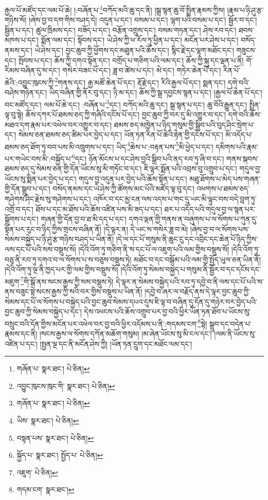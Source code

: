 རྒྱལ་པོ་མཛོད་དང་ལམ་པོ་ཆེ། །:བཞོན་པ་\footnote{གཞོན་པ་  སྣར་ཐང་།  པེ་ཅིན། }བཀོད་མའི་ཆུ་དང་ནི། །སྒྲ་སྙན་ཆུ་བོ་སྤྲིན་རྣམས་ཀྱིས། །རྣམ་པ་ཉི་ཤུ་རྩ་གཉིས་སོ། །ཞེས་བྱ་བ་དག་གིས་བཤད་དེ། འདུན་པ་དང་། བསམ་པ་དང་། ལྷག་པའི་བསམ་པ་དང་། སྦྱོར་བ་དང་། སྦྱིན་པ་དང་། ཚུལ་ཁྲིམས་དང་། བཟོད་པ་དང་། བརྩོན་འགྲུས་དང་། བསམ་གཏན་དང་། ཤེས་རབ་དང་། ཐབས་མཁས་པ་དང་། སྨོན་ལམ་དང་། སྟོབས་དང་། ཡེ་ཤེས་ཀྱི་ཕ་རོལ་ཏུ་ཕྱིན་པ་དང་། མངོན་པར་ཤེས་པ་དང་། བསོད་ནམས་དང་། ཡེ་ཤེས་དང་། བྱང་ཆུབ་ཀྱི་ཕྱོགས་དང་མཐུན་པའི་ཆོས་དང་། སྙིང་རྗེ་དང་ལྷག་མཐོང་དང་། གཟུངས་དང་། སྤོབས་པ་དང་། ཆོས་ཀྱི་དགའ་སྟོན་དང་། བགྲོད་པ་གཅིག་པའི་ལམ་དང་། ཆོས་ཀྱི་སྐུ་དང་ལྡན་པ་ནི། གོ་རིམས་བཞིན་དུ་ས་དང་། གསེར་བཟང་པོ་དང་། ཟླ་བ་ཚེས་པ་དང་། མེ་དང་། གཏེར་ཆེན་པོ་དང་། རིན་པོ་ཆེའི་:འབྱུང་ཁུངས་ཀྱི་\footnote{འབྱུང་ཁུངས་ཁུང་གི་  སྣར་ཐང་།  པེ་ཅིན། }གནས་དང་། རྒྱ་མཚོ་ཆེན་པོ་དང་། རྡོ་རྗེ་དང་། རིའི་རྒྱལ་པོ་དང་། སྨན་དང་། དགེ་བའི་བཤེས་གཉེན་དང་། ཡིད་བཞིན་གྱི་ནོར་བུ་དང་། ཉི་མ་དང་། ཆོས་ཀྱི་སྒྲ་དབྱངས་སྙན་པ་དང་། །རྒྱལ་པོ་ཆེན་པོ་དང་། བང་མཛོད་དང་། ལམ་པོ་ཆེ་དང་། :བཞོན་པ་\footnote{གཞོན་པ་  སྣར་ཐང་།  པེ་ཅིན། }དང་། བཀོད་མའི་ཆུ་དང་། སྒྲ་སྙན་པ་དང་། ཆུ་བོའི་རྒྱུན་དང་། སྤྲིན་ལྟ་བུ་སྟེ། ཆོས་དཀར་པོ་ཐམས་ཅད་ཀྱི་གཞིའི་དངོས་པོ་དང་། བྱང་ཆུབ་ཀྱི་བར་དུ་མི་འགྱུར་བ་དང་། དགེ་བའི་ཆོས་མཐའ་དག་རྣམ་པར་འཕེལ་བར་འགྱུར་བ་དང་། ཐམས་ཅད་མཁྱེན་པ་ཉིད་གསུམ་གྱི་སྒྲིབ་པའི་བུད་ཤིང་སྲེག་པ་དང་། སེམས་ཅན་ཐམས་ཅད་ཚིམ་པར་བྱེད་པ་དང་། ཡོན་ཏན་རིན་པོ་ཆེའི་རྟེན་གྱི་དངོས་པོ་དང་། མི་འདོད་པ་ཐམས་ཅད་ཐོག་ཏུ་བབ་པས་མི་འཁྲུགས་པ་དང་། ཡིད་\footnote{ཡིས་  སྣར་ཐང་།  པེ་ཅིན། }ཆེས་པ་:བརྟན་པས་\footnote{བསྟན་པས་  སྣར་ཐང་།  པེ་ཅིན། }མི་ཕྱེད་པ་དང་། དམིགས་པའི་རྣམ་པར་གཡེང་བས་མི་:བསྐྱོད་པ་\footnote{སྐྱོད་པ་  སྣར་ཐང་། སྤྱོད་པ་  པེ་ཅིན། }དང་། ཉོན་མོངས་པ་དང་ཤེས་བྱའི་སྒྲིབ་པའི་ནད་རབ་ཏུ་ཞི་བ་དང་། གནས་སྐབས་ཐམས་ཅད་དུ་སེམས་ཅན་གྱི་དོན་ཡོངས་སུ་མི་གཏོང་བ་དང་། ཇི་ལྟར་སྨོན་པའི་འབྲས་བུ་འགྲུབ་པ་དང་། གདུལ་བྱ་ཡོངས་སུ་སྨིན་པར་བྱེད་པ་དང་། གདུལ་བྱ་འདུན་པར་བྱེད་པའི་ཆོས་སྟོན་པ་དང་། མཐུ་ཐོགས་པ་མེད་པས་གཞན་གྱི་དོན་སྒྲུབ་པ་དང་། བསོད་ནམས་དང་ཡེ་ཤེས་ཀྱི་ཚོགས་མང་པོའི་མཛོད་ལྟ་བུ་དང་། འཕགས་པ་ཐམས་ཅད་གཤེགས་ཤིང་རྗེས་སུ་གཤེགས་པ་དང་། འཁོར་བ་དང་མྱ་ངན་ལས་འདས་པ་གང་དུ་ཡང་མི་ལྟུང་བས་བདེ་བླག་ཏུ་འགྲོ་བ་དང་། ཐོས་པ་དང་མ་ཐོས་པའི་ཆོས་འཛིན་པས་མི་ཟད་པ་དང་། ཐར་པ་འདོད་པའི་གདུལ་བྱ་ལ་སྙན་པར་སྒྲོགས་པ་དང་། གཞན་གྱི་དོན་བྱ་བ་ཐ་མི་དད་པ་དང་། དགའ་ལྡན་གྱི་གནས་ན་བཞུགས་པ་ལ་སོགས་པ་ཀུན་དུ་སྟོན་པར་རུང་བ་ཉིད་ཀྱིས་གྲངས་བཞིན་ནོ། །དེ་ལྟར་ན། དེ་ཡང་ས་གསེར་ཟླ་བ་མེ། །ཞེས་བྱ་བ་ལ་སོགས་པས་སེམས་བསྐྱེད་པ་ཉི་ཤུ་རྩ་གཉིས་བཤད་པ་ཡིན་ནོ། །དེ་ལ་དང་པོ་གསུམ་ནི་ཆུང་ངུ་དང་འབྲིང་དང་ཆེན་པོ་ཉིད་ཀྱིས་ལས་དང་པོ་པའི་སས་བསྡུས་སོ། །དེའི་འོག་ཏུ་གཅིག་ནི་ས་དང་པོ་ལ་འཇུག་པའི་ལམ་གྱིས་བསྡུས་སོ། །དེའི་འོག་ཏུ་བཅུ་ནི་རབ་ཏུ་དགའ་བ་ལ་སོགས་པ་ས་བཅུས་བསྡུས་ཏེ། མཐོང་བ་དང་བསྒོམ་པའི་ལམ་གྱི་སྤྱོད་ཡུལ་ཅན་ཡིན་ནོ། །དེའི་འོག་ཏུ་ལྔ་ནི་ཁྱད་པར་གྱི་ལམ་གྱིས་བསྡུས་སོ། །དེའི་འོག་ཏུ་སེམས་བསྐྱེད་པ་གསུམ་ནི་སྦྱོར་བ་དང་དངོས་དང་མཇུག་\footnote{འཇུག་  པེ་ཅིན། }གི་སྒོ་ནས་སངས་རྒྱས་ཀྱི་སས་བསྡུས་ཏེ། དེ་ལྟར་ན་སེམས་བསྐྱེད་པའི་རབ་ཏུ་དབྱེ་བ་ནི་ལས་དང་པོ་པའི་ས་ནས་བཟུང་སྟེ་སངས་རྒྱས་ཀྱི་སའི་བར་གྱིས་བསྡུས་པ་ཡིན་ནོ། །དབྱེ་བ་ཞར་ལ་བརྗོད་ནས་དེ་ལྟར་བྱང་ཆུབ་ཀྱི་སེམས་དང་པོ་ལ་སོགས་པ་བསྐྱེད་པའི་བྱང་ཆུབ་སེམས་དཔའ་དུས་ཇི་ལྟ་བ་བཞིན་དུ་དོན་དུ་གཉེར་བར་བྱེད་པའི་བྱང་ཆུབ་ཀྱི་སེམས་བསྐྱེད་པ་དང་། དེས་འཕངས་པའི་ཆོས་འགྲུབ་པར་བྱ་བའི་ཕྱིར་ཡོན་ཏན་ཐོབ་པ་ཡོངས་སུ་བསྲུང་བའི་དོན་གྱིས་མངོན་པར་འཕེལ་བར་བྱ་བའི་ཕྱིར་འདོམས་པ་ནི་:གདམས་ངག་\footnote{གདམ་ངག་  སྣར་ཐང་། }སྟེ། སྒྲུབ་དང་བདེན་པ་རྣམས་དང་ནི། །སངས་རྒྱས་ལ་སོགས་དཀོན་མཆོག་གསུམ། །མ་ཞེན་ཡོངས་སུ་མི་ངལ་དང་། །ལམ་ནི་ཡོངས་སུ་འཛིན་པ་དང་། །སྤྱན་ལྔ་དང་ནི་མངོན་ཤེས་ཀྱི། །ཡོན་ཏན་དྲུག་དང་མཐོང་ལམ་དང་། 